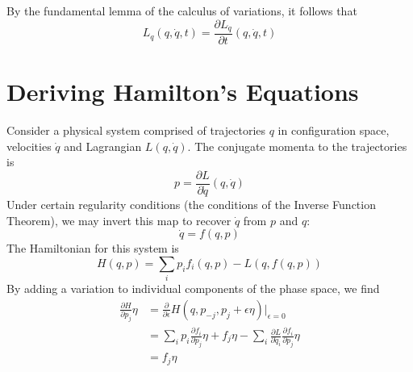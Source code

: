 \documentclass[11pt]{article}
\theoremstyle{definition}
\begin{document}
By the fundamental lemma of the calculus of variations, it follows that
\begin{equation}
L_q \left( q, \dot{q}, t \right) = \frac{\partial L_{\dot{q}}}{\partial t} \left( q, \dot{q}, t \right)
\end{equation}


\section{Deriving Hamilton's Equations}
Consider a physical system comprised of trajectories $q$ in configuration space, velocities $\dot{q}$ and Lagrangian $L \left( q , \dot{q} \right)$. The conjugate momenta to the trajectories is
\begin{equation}
p = \frac{\partial L}{\partial \dot{q}} \left( q, \dot{q} \right)
\end{equation}
Under certain regularity conditions (the conditions of the Inverse Function Theorem), we may invert this map to recover $\dot{q}$ from $p$ and $q$:
\begin{equation}
\dot{q} = f \left( q, p \right)
\end{equation}
The Hamiltonian for this system is
\begin{equation}
H \left( q, p \right) = \sum_i p_i f_i \left( q, p \right)
- L \left( q , f \left( q, p \right) \right)
\end{equation}
By adding a variation to individual components of the phase space, we find 
\begin{equation}
\begin{split}
\frac{\partial H}{\partial p_j} \eta & =\frac{\partial}{\partial \epsilon} H \left( q , p_{-j} , p_j + \epsilon \eta \right) \rvert_{\epsilon = 0} \\
& = \sum_i p_i \frac{\partial f_i}{\partial p_j} \eta +
f_j \eta
- \sum_i \frac{\partial L}{\partial \dot{q}_i} \frac{\partial f_i}{\partial p_j} \eta \\
& = f_j \eta
\end{split}
\end{equation}
\end{document}
